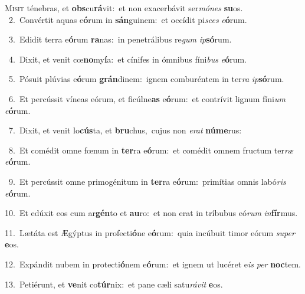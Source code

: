 \lettrine{\initial\textcolor{\initialcolor}{M}}{isit} ténebras, et \textbf{obs}\-cu\-\textbf{rá}\-vit:~\star et non exacerbávit ser\-\textit{mó}\-\textit{nes} \textbf{su}\-os.\\
{\numbfont\textcolor{\numbcolor}{~2.}}~Convértit aquas e\-\textbf{ó}\-rum in \textbf{sán}\-guinem:~\star et occídit pi\textit{sces} \textit{e}\-\textbf{ó}rum.\par
{\numbfont\textcolor{\numbcolor}{~3.}}~Edidit terra e\-\textbf{ó}\-rum \textbf{ra}\-nas:~\star in penetrálibus re\textit{gum} \textit{ip}\-\textbf{só}rum.\par
{\numbfont\textcolor{\numbcolor}{~4.}}~Dixit, et venit cœ\-\textbf{no}\-my\-\textbf{í}\-a:~\star et cínifes in ómnibus fíni\textit{bus} \textit{e}\-\textbf{ó}rum.\par
{\numbfont\textcolor{\numbcolor}{~5.}}~Pósuit plúvias e\-\textbf{ó}\-rum \textbf{grán}\-dinem:~\star ignem comburéntem in ter\textit{ra} \textit{ip}\-\textbf{só}rum.\par
{\numbfont\textcolor{\numbcolor}{~6.}}~Et percússit víneas eórum, et ficúlne\textbf{as} e\-\textbf{ó}\-rum:~\star et contrívit lignum fíni\textit{um} \textit{e}\-\textbf{ó}rum.\par
{\numbfont\textcolor{\numbcolor}{~7.}}~Dixit, et venit lo\-\textbf{cús}\-ta, et \textbf{bru}\-chus,~\star cujus non \textit{e}\-\textit{rat} \textbf{nú}\-\textbf{me}rus:\par
{\numbfont\textcolor{\numbcolor}{~8.}}~Et comédit omne fœnum in \textbf{ter}\-ra e\-\textbf{ó}\-rum:~\star et comédit omnem fructum ter\textit{ræ} \textit{e}\-\textbf{ó}rum.\par
{\numbfont\textcolor{\numbcolor}{~9.}}~Et percússit omne primogénitum in \textbf{ter}\-ra e\-\textbf{ó}\-rum:~\star primítias omnis labó\textit{ris} \textit{e}\-\textbf{ó}rum.\par
{\numbfont\textcolor{\numbcolor}{10.}}~Et edúxit eos cum ar\-\textbf{gén}\-to et \textbf{au}\-ro:~\star et non erat in tríbubus eó\textit{rum} \textit{in}\-\textbf{fír}mus.\par
{\numbfont\textcolor{\numbcolor}{11.}}~Lætáta est Ægýptus in profecti\-\textbf{ó}\-ne e\-\textbf{ó}\-rum:~\star quia incúbuit timor eórum \textit{su}\-\textit{per} \textbf{e}\-os.\par
{\numbfont\textcolor{\numbcolor}{12.}}~Expándit nubem in protecti\-\textbf{ó}\-nem e\-\textbf{ó}\-rum:~\star et ignem ut lucéret e\textit{is} \textit{per} \textbf{noc}\-tem.\par
{\numbfont\textcolor{\numbcolor}{13.}}~Petiérunt, et \textbf{ve}\-nit co\-\textbf{túr}\-nix:~\star et pane cæli satu\-\textit{rá}\-\textit{vit} \textbf{e}\-os.\par
